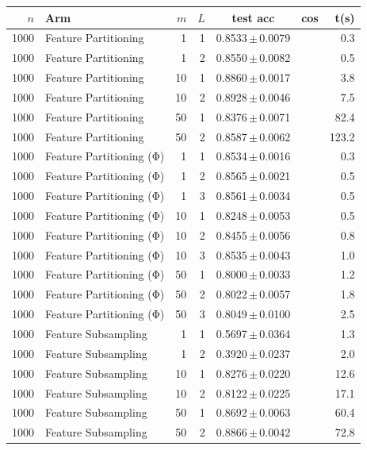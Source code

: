 \begin{table}[ht]
\centering\small
\begin{tabular}{rlrrccr}
\toprule
$n$ & Arm & $m$ & $L$ & test acc & cos & t(s) \\
\midrule
1000 & Feature Partitioning & 1 & 1 & 0.8533\,$\pm$\,0.0079 &  & 0.3 \\
1000 & Feature Partitioning & 1 & 2 & 0.8550\,$\pm$\,0.0082 &  & 0.5 \\
1000 & Feature Partitioning & 10 & 1 & 0.8860\,$\pm$\,0.0017 &  & 3.8 \\
1000 & Feature Partitioning & 10 & 2 & 0.8928\,$\pm$\,0.0046 &  & 7.5 \\
1000 & Feature Partitioning & 50 & 1 & 0.8376\,$\pm$\,0.0071 &  & 82.4 \\
1000 & Feature Partitioning & 50 & 2 & 0.8587\,$\pm$\,0.0062 &  & 123.2 \\
1000 & Feature Partitioning (Φ) & 1 & 1 & 0.8534\,$\pm$\,0.0016 &  & 0.3 \\
1000 & Feature Partitioning (Φ) & 1 & 2 & 0.8565\,$\pm$\,0.0021 &  & 0.5 \\
1000 & Feature Partitioning (Φ) & 1 & 3 & 0.8561\,$\pm$\,0.0034 &  & 0.5 \\
1000 & Feature Partitioning (Φ) & 10 & 1 & 0.8248\,$\pm$\,0.0053 &  & 0.5 \\
1000 & Feature Partitioning (Φ) & 10 & 2 & 0.8455\,$\pm$\,0.0056 &  & 0.8 \\
1000 & Feature Partitioning (Φ) & 10 & 3 & 0.8535\,$\pm$\,0.0043 &  & 1.0 \\
1000 & Feature Partitioning (Φ) & 50 & 1 & 0.8000\,$\pm$\,0.0033 &  & 1.2 \\
1000 & Feature Partitioning (Φ) & 50 & 2 & 0.8022\,$\pm$\,0.0057 &  & 1.8 \\
1000 & Feature Partitioning (Φ) & 50 & 3 & 0.8049\,$\pm$\,0.0100 &  & 2.5 \\
1000 & Feature Subsampling & 1 & 1 & 0.5697\,$\pm$\,0.0364 &  & 1.3 \\
1000 & Feature Subsampling & 1 & 2 & 0.3920\,$\pm$\,0.0237 &  & 2.0 \\
1000 & Feature Subsampling & 10 & 1 & 0.8276\,$\pm$\,0.0220 &  & 12.6 \\
1000 & Feature Subsampling & 10 & 2 & 0.8122\,$\pm$\,0.0225 &  & 17.1 \\
1000 & Feature Subsampling & 50 & 1 & 0.8692\,$\pm$\,0.0063 &  & 60.4 \\
1000 & Feature Subsampling & 50 & 2 & 0.8866\,$\pm$\,0.0042 &  & 72.8 \\

\end{tabular}
\end{table}

